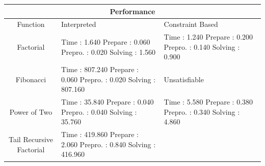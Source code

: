 \begin{table}[p!]
\centering
\begin{tabular}{|c|m{10em}|m{10em}|}
\hline
\multicolumn{3}{|c|}{\textbf{Performance}}\\
\hline
Function & Interpreted  & Constraint Based \\
\hline
Factorial 
& 
\mbox{}\newline
Time        : 1.640 \newline
  Prepare   : 0.060 \newline
  Prepro.   : 0.020 \newline
  Solving   : 1.560 \newline
& 
\mbox{}\newline
Time        : 1.240 \newline
  Prepare   : 0.200 \newline
  Prepro.   : 0.140 \newline
  Solving   : 0.900 \newline
\\
\hline
Fibonacci 
&
\mbox{}\newline 
Time        : 807.240 \newline
  Prepare   : 0.060 \newline
  Prepro.   : 0.020 \newline
  Solving   : 807.160 \newline
& 
Unsatisfiable
\\
\hline
Power of Two 
&
\mbox{}\newline 
Time        : 35.840 \newline
  Prepare   : 0.040 \newline
  Prepro.   : 0.040 \newline
  Solving   : 35.760 \newline
& 
\mbox{}\newline 
Time        : 5.580 \newline
  Prepare   : 0.380 \newline
  Prepro.   : 0.340 \newline
  Solving   : 4.860 \newline
\\
\hline
Tail Recursive Factorial
&
\mbox{}\newline 
Time        : 419.860 \newline
  Prepare   : 2.060 \newline
  Prepro.   : 0.840 \newline
  Solving   : 416.960 \newline
& 
\mbox{}\newline 

\end{tabular}
\end{table}
